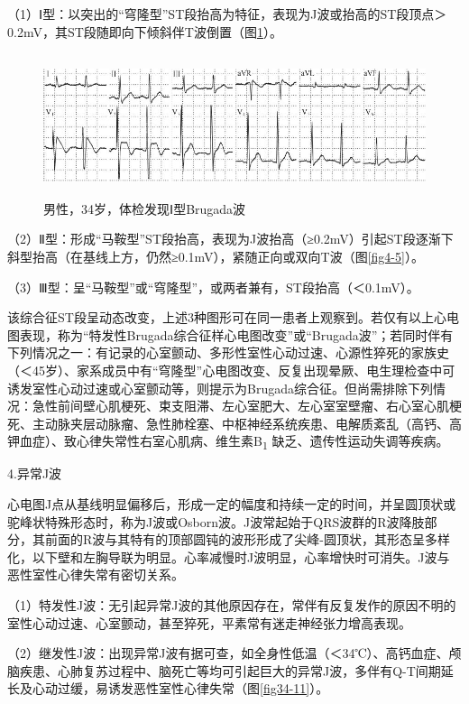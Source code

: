 （1）Ⅰ型：以突出的“穹隆型”ST段抬高为特征，表现为J波或抬高的ST段顶点＞0.2mV，其ST段随即向下倾斜伴T波倒置（图\ref{fig34-10}）。

\begin{figure}[!htbp]
 \centering
 \includegraphics[width=5.60417in,height=1.64583in]{./images/Image00550.jpg}
 \captionsetup{justification=centering}
 \caption{男性，34岁，体检发现Ⅰ型Brugada波}
 \label{fig34-10}
  \end{figure} 

（2）Ⅱ型：形成“马鞍型”ST段抬高，表现为J波抬高（≥0.2mV）引起ST段逐渐下斜型抬高（在基线上方，仍然≥0.1mV），紧随正向或双向T波（图\ref{fig4-5}）。

（3）Ⅲ型：呈“马鞍型”或“穹隆型”，或两者兼有，ST段抬高（＜0.1mV）。

该综合征ST段呈动态改变，上述3种图形可在同一患者上观察到。若仅有以上心电图表现，称为“特发性Brugada综合征样心电图改变”或“Brugada波”；若同时伴有下列情况之一：有记录的心室颤动、多形性室性心动过速、心源性猝死的家族史（＜45岁）、家系成员中有“穹隆型”心电图改变、反复出现晕厥、电生理检查中可诱发室性心动过速或心室颤动等，则提示为Brugada综合征。但尚需排除下列情况：急性前间壁心肌梗死、束支阻滞、左心室肥大、左心室室壁瘤、右心室心肌梗死、主动脉夹层动脉瘤、急性肺栓塞、中枢神经系统疾患、电解质紊乱（高钙、高钾血症）、致心律失常性右室心肌病、维生素B\textsubscript{1}
缺乏、遗传性运动失调等疾病。

4.异常J波

心电图J点从基线明显偏移后，形成一定的幅度和持续一定的时间，并呈圆顶状或驼峰状特殊形态时，称为J波或Osborn波。J波常起始于QRS波群的R波降肢部分，其前面的R波与其特有的顶部圆钝的波形形成了尖峰-圆顶状，其形态呈多样化，以下壁和左胸导联为明显。心率减慢时J波明显，心率增快时可消失。J波与恶性室性心律失常有密切关系。

（1）特发性J波：无引起异常J波的其他原因存在，常伴有反复发作的原因不明的室性心动过速、心室颤动，甚至猝死，平素常有迷走神经张力增高表现。

（2）继发性J波：出现异常J波有据可查，如全身性低温（＜34℃）、高钙血症、颅脑疾患、心肺复苏过程中、脑死亡等均可引起巨大的异常J波，多伴有Q-T间期延长及心动过缓，易诱发恶性室性心律失常（图\ref{fig34-11}）。

